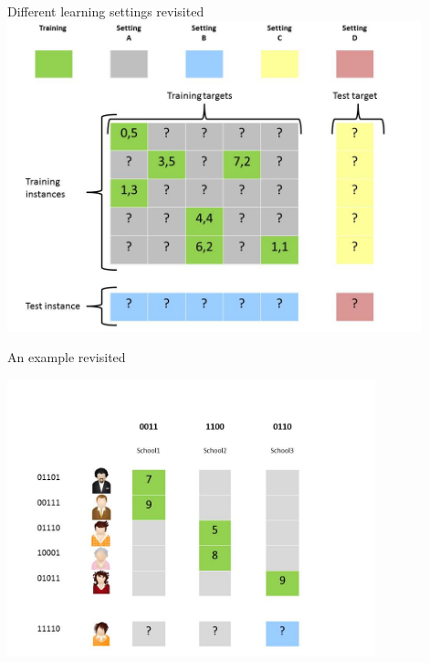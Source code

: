 \documentclass[]{beamer}
\begin{document}
\begin{frame}{Different learning settings revisited}
   \center
	\vspace{0.4cm}
   \includegraphics[width=0.9\textwidth]{Figures/pictures/Slide16} %
\end{frame}

\begin{frame}{An example revisited}
\begin{center}
\includegraphics[width=0.8\textwidth,trim = 0 0 100 30,clip]{Figures/pictures/Slide6}
\end{center}

\end{frame}

%
\end{document}
